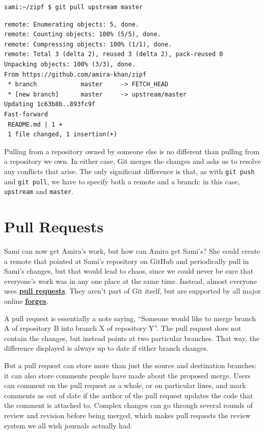 \documentclass[
]{krantz}
\newcommand{\gref}[2]{\hyperlink{#2}{\textbf{#1}}}
\begin{document}
\begin{verbatim}
sami:~/zipf $ git pull upstream master
\end{verbatim}

\begin{verbatim}
remote: Enumerating objects: 5, done.
remote: Counting objects: 100% (5/5), done.
remote: Compressing objects: 100% (1/1), done.
remote: Total 3 (delta 2), reused 3 (delta 2), pack-reused 0
Unpacking objects: 100% (3/3), done.
From https://github.com/amira-khan/zipf
 * branch            master     -> FETCH_HEAD
 * [new branch]      master     -> upstream/master
Updating 1c63b8b..893fc9f
Fast-forward
 README.md | 1 +
 1 file changed, 1 insertion(+)
\end{verbatim}

Pulling from a repository owned by someone else
is no different than pulling from a repository we own.
In either case,
Git merges the changes and asks us to resolve any conflicts that arise.
The only significant difference is that,
as with \texttt{git\ push} and \texttt{git\ pull},
we have to specify both a remote and a branch:
in this case,
\texttt{upstream} and \texttt{master}.

\hypertarget{git-advanced-pull-requests}{%
\section{Pull Requests}\label{git-advanced-pull-requests}}

Sami can now get Amira's work,
but how can Amira get Sami's?
She could create a remote that pointed at Sami's repository on GitHub
and periodically pull in Sami's changes,
but that would lead to chaos,
since we could never be sure that everyone's work was in any one place at the same time.
Instead,
almost everyone uses \gref{pull requests}{pull\_request}.
They aren't part of Git itself,
but are supported by all major online \gref{forges}{forge}.

A pull request is essentially a note saying,
``Someone would like to merge branch A of repository B into branch X of repository Y''.
The pull request does not contain the changes,
but instead points at two particular branches.
That way,
the difference displayed is always up to date
if either branch changes.

But a pull request can store more than just the source and destination branches:
it can also store comments people have made about the proposed merge.
Users can comment on the pull request as a whole,
or on particular lines,
and mark comments as out of date
if the author of the pull request updates the code that the comment is attached to.
Complex changes can go through several rounds of review and revision
before being merged,
which makes pull requests the review system we all wish journals actually had.
\end{document}
